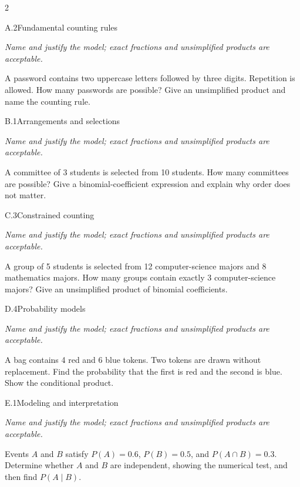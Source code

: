 \documentclass[9pt]{extarticle}
\begin{document}
\CoreWorkArea
\FormBreak
{}
\begin{multicols}{2}
\begin{CoreProblem}{A.2}{Fundamental counting rules}
{\scriptsize\textit{Name and justify the model; exact fractions and unsimplified products are acceptable.}\par}
A password contains two uppercase letters followed by three digits.
    Repetition is allowed. How many passwords are possible? Give an unsimplified
    product and name the counting rule.
\end{CoreProblem}
\begin{CoreProblem}{B.1}{Arrangements and selections}
{\scriptsize\textit{Name and justify the model; exact fractions and unsimplified products are acceptable.}\par}
A committee of 3 students is selected from 10 students. How many
    committees are possible? Give a binomial-coefficient expression and explain
    why order does not matter.
\end{CoreProblem}
\begin{CoreProblem}{C.3}{Constrained counting}
{\scriptsize\textit{Name and justify the model; exact fractions and unsimplified products are acceptable.}\par}
A group of 5 students is selected from 12 computer-science majors and
    8 mathematics majors. How many groups contain exactly 3 computer-science
    majors? Give an unsimplified product of binomial coefficients.
\end{CoreProblem}
\columnbreak
\begin{CoreProblem}{D.4}{Probability models}
{\scriptsize\textit{Name and justify the model; exact fractions and unsimplified products are acceptable.}\par}
A bag contains 4 red and 6 blue tokens. Two tokens are drawn without
    replacement. Find the probability that the first is red and the second is
    blue. Show the conditional product.
\end{CoreProblem}
\begin{CoreProblem}{E.1}{Modeling and interpretation}
{\scriptsize\textit{Name and justify the model; exact fractions and unsimplified products are acceptable.}\par}
Events $A$ and $B$ satisfy $P(A)=0.6$, $P(B)=0.5$, and
    $P(A\cap B)=0.3$. Determine whether $A$ and $B$ are independent, showing
    the numerical test, and then find $P(A\mid B)$.
\end{CoreProblem}
\end{multicols}
\end{document}
